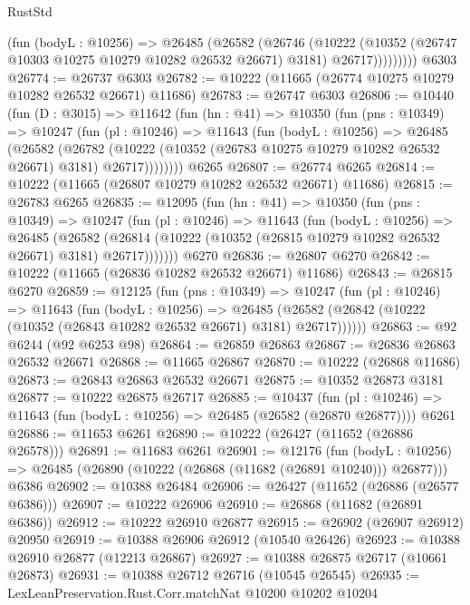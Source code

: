 \begin{lexlean}{RustStd}
\begin{coremodule}
              (fun (bodyL : @10256) =>
              @26485
                (@26582
                  (@26746
                    (@10222
                      (@10352 (@26747 @10303 @10275 @10279 @10282 @26532 @26671) @3181)
                      @26717)))))))))
    @6303
@26774 := @26737 @6303
@26782 := @10222 (@11665 (@26774 @10275 @10279 @10282 @26532 @26671) @11686)
@26783 := @26747 @6303
@26806 := @10440
    (fun (D : @3015) =>
    @11642
      (fun (hn : @41) =>
      @10350
        (fun (pns : @10349) =>
        @10247
          (fun (pl : @10246) =>
          @11643
            (fun (bodyL : @10256) =>
            @26485
              (@26582
                (@26782
                  (@10222 (@10352 (@26783 @10275 @10279 @10282 @26532 @26671) @3181) @26717))))))))
    @6265
@26807 := @26774 @6265
@26814 := @10222 (@11665 (@26807 @10279 @10282 @26532 @26671) @11686)
@26815 := @26783 @6265
@26835 := @12095
    (fun (hn : @41) =>
    @10350
      (fun (pns : @10349) =>
      @10247
        (fun (pl : @10246) =>
        @11643
          (fun (bodyL : @10256) =>
          @26485
            (@26582
              (@26814 (@10222 (@10352 (@26815 @10279 @10282 @26532 @26671) @3181) @26717)))))))
    @6270
@26836 := @26807 @6270
@26842 := @10222 (@11665 (@26836 @10282 @26532 @26671) @11686)
@26843 := @26815 @6270
@26859 := @12125
    (fun (pns : @10349) =>
    @10247
      (fun (pl : @10246) =>
      @11643
        (fun (bodyL : @10256) =>
        @26485 (@26582 (@26842 (@10222 (@10352 (@26843 @10282 @26532 @26671) @3181) @26717))))))
@26863 := @92 @6244 (@92 @6253 @98)
@26864 := @26859 @26863
@26867 := @26836 @26863 @26532 @26671
@26868 := @11665 @26867
@26870 := @10222 (@26868 @11686)
@26873 := @26843 @26863 @26532 @26671
@26875 := @10352 @26873 @3181
@26877 := @10222 @26875 @26717
@26885 := @10437
    (fun (pl : @10246) => @11643 (fun (bodyL : @10256) => @26485 (@26582 (@26870 @26877))))
    @6261
@26886 := @11653 @6261
@26890 := @10222 (@26427 (@11652 (@26886 @26578)))
@26891 := @11683 @6261
@26901 := @12176
    (fun (bodyL : @10256) => @26485 (@26890 (@10222 (@26868 (@11682 (@26891 @10240))) @26877)))
    @6386
@26902 := @10388 @26484
@26906 := @26427 (@11652 (@26886 (@26577 @6386)))
@26907 := @10222 @26906
@26910 := @26868 (@11682 (@26891 @6386))
@26912 := @10222 @26910 @26877
@26915 := @26902 (@26907 @26912) @20950
@26919 := @10388 @26906 @26912 (@10540 @26426)
@26923 := @10388 @26910 @26877 (@12213 @26867)
@26927 := @10388 @26875 @26717 (@10661 @26873)
@26931 := @10388 @26712 @26716 (@10545 @26545)
@26935 := LexLeanPreservation.Rust.Corr.matchNat @10200 @10202 @10204

\end{coremodule}
\end{lexlean}
